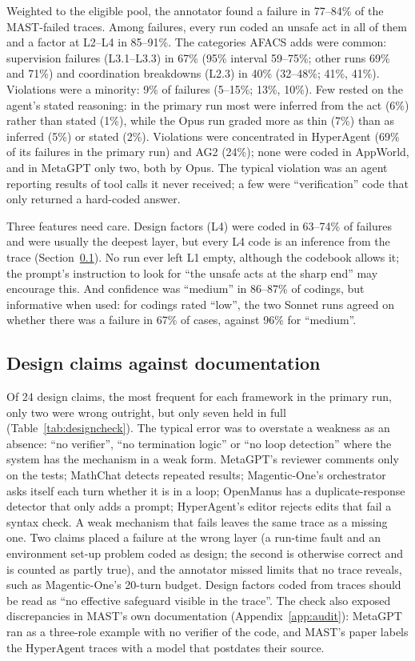 \documentclass[11pt]{article}
\begin{document}
Weighted to the eligible pool, the annotator found a failure in 77--84\% of the
MAST-failed traces. Among failures, every run coded an unsafe act in all of them
and a factor at L2--L4 in 85--91\%. The categories AFACS adds were common:
supervision failures (L3.1--L3.3) in 67\% (95\% interval 59--75\%; other runs 69\%
and 71\%) and coordination breakdowns (L2.3) in 40\% (32--48\%; 41\%, 41\%).
Violations were a minority: 9\% of failures (5--15\%; 13\%, 10\%). Few rested on the
agent's stated reasoning: in the primary run most were inferred from the act (6\%)
rather than stated (1\%), while the Opus run graded more as thin (7\%) than as
inferred (5\%) or stated (2\%). Violations were concentrated in HyperAgent (69\% of
its failures in the primary run) and AG2 (24\%); none were coded in AppWorld, and in
MetaGPT only two, both by Opus. The typical violation was an agent reporting
results of tool calls it never received; a few were ``verification'' code that only
returned a hard-coded answer.

Three features need care. Design factors (L4) were coded in 63--74\% of failures
and were usually the deepest layer, but every L4 code is an inference from the
trace (Section~\ref{sec:designcheck}). No run ever left L1 empty, although the
codebook allows it; the prompt's instruction to look for ``the unsafe acts at the
sharp end'' may encourage this. And confidence was ``medium'' in 86--87\% of
codings, but informative when used: for codings rated ``low'', the two Sonnet runs
agreed on whether there was a failure in 67\% of cases, against 96\% for
``medium''.

\subsection{Design claims against documentation}
\label{sec:designcheck}

Of 24 design claims, the most frequent for each framework in the primary run, only
two were wrong outright, but only seven held in full (Table~\ref{tab:designcheck}). The typical error was
to overstate a weakness as an absence: ``no verifier'', ``no termination logic'' or
``no loop detection'' where the system has the mechanism in a weak form. MetaGPT's
reviewer comments only on the tests; MathChat detects repeated results;
Magentic-One's orchestrator asks itself each turn whether it is in a loop;
OpenManus has a duplicate-response detector that only adds a prompt; HyperAgent's
editor rejects edits that fail a syntax check. A weak mechanism that fails leaves
the same trace as a missing one. Two claims placed a failure at the wrong layer (a
run-time fault and an environment set-up problem coded as design; the second is
otherwise correct and is counted as partly true), and the
annotator missed limits that no trace reveals, such as Magentic-One's 20-turn
budget. Design factors coded from traces should be read as ``no effective
safeguard visible in the trace''. The check also exposed discrepancies in MAST's
own documentation (Appendix~\ref{app:audit}): MetaGPT ran as a three-role example
with no verifier of the code, and MAST's paper labels the HyperAgent traces with a
model that postdates their source.
\end{document}
